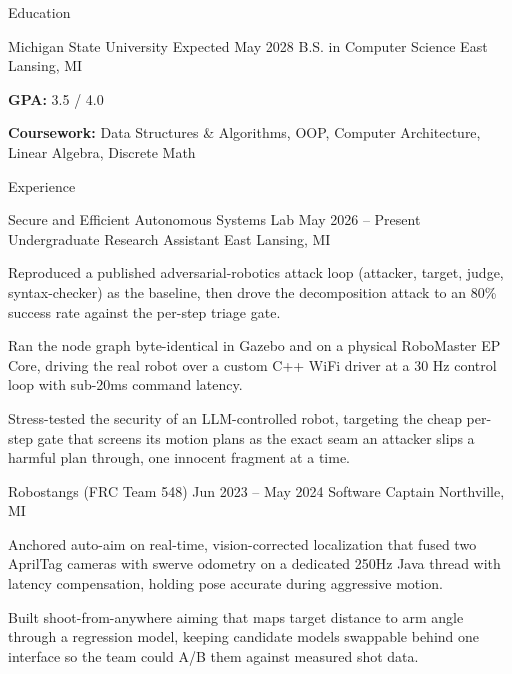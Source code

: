 \documentclass[
	11pt
]{../../../template}
\begin{document}
	\begin{rSection}{E}{ducation}
		\begin{rSectionEntry}
			{Michigan State University}
			{Expected May 2028}
			{B.S. in Computer Science}
			{}
			{East Lansing, MI}

			\item \textbf{GPA:} 3.5 / 4.0
			\item \textbf{Coursework:} Data Structures \& Algorithms, OOP, Computer Architecture, Linear Algebra, Discrete Math
		\end{rSectionEntry}
	\end{rSection}

	\begin{rSection}{E}{xperience}
		\begin{rSectionEntry}
			{Secure and Efficient Autonomous Systems Lab}
			{May 2026 -- Present}
			{Undergraduate Research Assistant}
			{}
			{East Lansing, MI}

			\item Reproduced a published adversarial-robotics attack loop (attacker, target, judge, syntax-checker) as the baseline, then drove the decomposition attack to an 80\% success rate against the per-step triage gate.
			\item Ran the node graph byte-identical in Gazebo and on a physical RoboMaster EP Core, driving the real robot over a custom C++ WiFi driver at a 30 Hz control loop with sub-20ms command latency.
			\item Stress-tested the security of an LLM-controlled robot, targeting the cheap per-step gate that screens its motion plans as the exact seam an attacker slips a harmful plan through, one innocent fragment at a time.
		\end{rSectionEntry}

		\begin{rSectionEntry}
			{Robostangs (FRC Team 548)}
			{Jun 2023 -- May 2024}
			{Software Captain}
			{}
			{Northville, MI}

			\item Anchored auto-aim on real-time, vision-corrected localization that fused two AprilTag cameras with swerve odometry on a dedicated 250Hz Java thread with latency compensation, holding pose accurate during aggressive motion.
			\item Built shoot-from-anywhere aiming that maps target distance to arm angle through a regression model, keeping candidate models swappable behind one interface so the team could A/B them against measured shot data.
		\end{rSectionEntry}
	\end{rSection}
\end{document}
